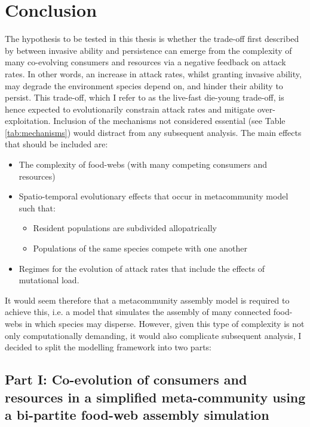 \documentclass[a4paper]{report}
\begin{document}
\section{Conclusion \label{sec:framework_def}}

The hypothesis to be tested in this thesis is whether the trade-off first described by \citep{Goodnight2008} between invasive ability and persistence can emerge from the complexity of many co-evolving consumers and resources via a negative feedback on attack rates. In other words, an increase in attack rates, whilst granting invasive ability, may degrade the environment species depend on, and hinder their ability to persist. This trade-off, which I refer to as the live-fast die-young trade-off, is hence expected to evolutionarily constrain attack rates and mitigate over-exploitation. Inclusion of the mechanisms not considered essential (see Table \ref{tab:mechanisms}) would distract from any subsequent analysis. The main effects that should be included are:\\

\begin{itemize}

\item The complexity of food-webs (with many competing consumers and resources)
\item Spatio-temporal evolutionary effects that occur in metacommunity model such that:

\begin{itemize}
\item Resident populations are subdivided allopatrically
\item Populations of the same species compete with one another
\end{itemize}

\item Regimes for the evolution of attack rates that include the effects of mutational load. 

\end{itemize}
 
It would seem therefore that a metacommunity assembly model is required to achieve this, i.e. a model that simulates the assembly of many connected food-webs in which species may disperse. However, given this type of complexity is not only computationally demanding, it would also complicate subsequent analysis, I decided to split the modelling framework into two parts:

\subsection{Part I: Co-evolution of consumers and resources in a simplified meta-community using a bi-partite food-web assembly simulation }
\end{document}
